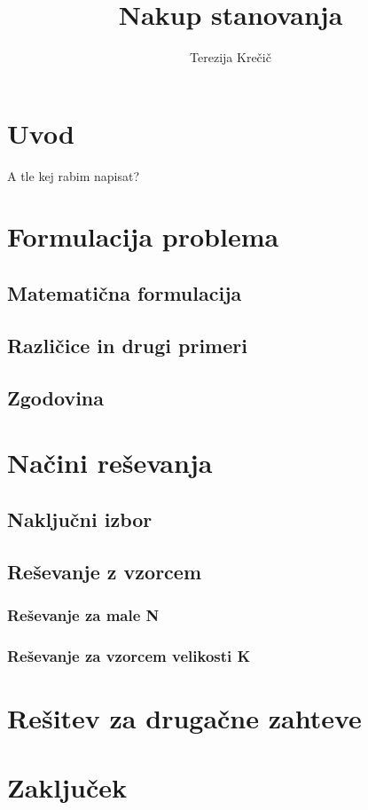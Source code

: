 \documentclass[a4paper, 12pt, titlepage]{article}
\author{Terezija Krečič}
\title{Nakup stanovanja}
\begin{document}
\maketitle
\tableofcontents
\newpage

\section{Uvod}
A tle kej rabim napisat?
\newpage
\section{Formulacija problema}
\subsection{Matematična formulacija}
\subsection{Različice in drugi primeri}
\subsection{Zgodovina}

\section{Načini reševanja}
\subsection{Naključni izbor}
\subsection{Reševanje z vzorcem}
\subsubsection{Reševanje za male N}
\subsubsection{Reševanje za vzorcem velikosti K}
\section{Rešitev za drugačne zahteve}

\section{Zaključek}
\end{document}
